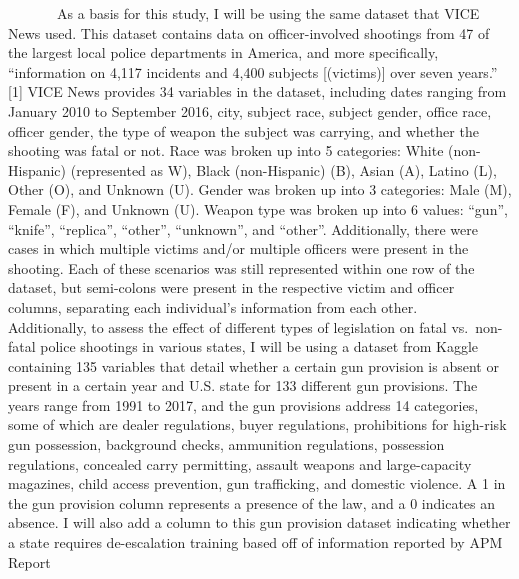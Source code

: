 \documentclass[
]{article}
\begin{document}
~~~~~~~As a basis for this study, I will be using the same dataset that
VICE News used. This dataset contains data on officer-involved shootings
from 47 of the largest local police departments in America, and more
specifically, ``information on 4,117 incidents and 4,400 subjects
{[}(victims){]} over seven years.'' {[}1{]} VICE News provides 34
variables in the dataset, including dates ranging from January 2010 to
September 2016, city, subject race, subject gender, office race, officer
gender, the type of weapon the subject was carrying, and whether the
shooting was fatal or not. Race was broken up into 5 categories: White
(non-Hispanic) (represented as W), Black (non-Hispanic) (B), Asian (A),
Latino (L), Other (O), and Unknown (U). Gender was broken up into 3
categories: Male (M), Female (F), and Unknown (U). Weapon type was
broken up into 6 values: ``gun'', ``knife'', ``replica'', ``other'',
``unknown'', and ``other''. Additionally, there were cases in which
multiple victims and/or multiple officers were present in the shooting.
Each of these scenarios was still represented within one row of the
dataset, but semi-colons were present in the respective victim and
officer columns, separating each individual's information from each
other.\\
\hspace*{0.333em}\hspace*{0.333em}\hspace*{0.333em}\hspace*{0.333em}\hspace*{0.333em}\hspace*{0.333em}Additionally,
to assess the effect of different types of legislation on fatal
vs.~non-fatal police shootings in various states, I will be using a
dataset from Kaggle containing 135 variables that detail whether a
certain gun provision is absent or present in a certain year and U.S.
state for 133 different gun provisions. The years range from 1991 to
2017, and the gun provisions address 14 categories, some of which are
dealer regulations, buyer regulations, prohibitions for high-risk gun
possession, background checks, ammunition regulations, possession
regulations, concealed carry permitting, assault weapons and
large-capacity magazines, child access prevention, gun trafficking, and
domestic violence. A 1 in the gun provision column represents a presence
of the law, and a 0 indicates an absence. I will also add a column to
this gun provision dataset indicating whether a state requires
de-escalation training based off of information reported by APM Report
\end{document}
